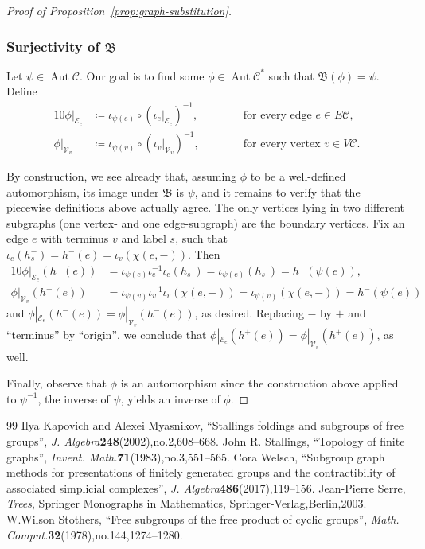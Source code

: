 \documentclass[10pt,a4paper]{amsart}
\theoremstyle{definition}
\newcommand{\cC}{\mathcal{C}}
\newcommand{\cV}{\mathcal{V}}
\newcommand{\cE}{\mathcal{E}}
\DeclareMathOperator{\aut}{Aut}
\newcommand{\Con}{\mathfrak{B}}
\begin{document}
\begin{proof}[Proof of Proposition~\ref{prop:graph-substitution}]

\subsubsection*{Surjectivity of $\Con$} Let ${\psi}\in \aut \cC$. Our goal is to find some ${\phi}\in \aut\cC^*$ such that $\Con({\phi}) = {\psi}$.
Define
\begin{alignat*}{10}
{\phi}|_{\cE_e} &\coloneqq {\iota}_{{\psi}(e)}{\circ}({\iota}_e|_{\cE_e})^{-1}, \qquad& &\text{ for every edge } e \in E\cC,\\
{\phi}|_{\cV_v} &\coloneqq {\iota}_{{\psi}(v)}{\circ}({\iota}_v|_{\cV_v})^{-1}, \qquad &&\text{ for every vertex } v \in V\cC.
\end{alignat*}
 
By construction, we see already that, assuming ${\phi}$ to be a well-defined automorphism, its image under $\Con$ is ${\psi}$, and it remains to verify that the piecewise definitions above actually agree. The only vertices lying in two different subgraphs (one vertex- and one edge-subgraph) are the boundary vertices. Fix an edge $e$ with terminus $v$ and label $s$, such that ${\iota}_e(h_s^{-}) = h^{-}(e) = {\iota}_v({\chi}(e, -))$. Then
\begin{alignat*}{10}
{\phi}|_{\cE_e}(h^{-}(e)) &= {\iota}_{{\psi}(e)}{\iota}_e^{-1}{\iota}_e(h_s^{-}) = {\iota}_{{\psi}(e)}(h_s^{-}) = h^{-}({\psi}(e)),\\
{\phi}|_{\cV_v}(h^{-}(e)) &= {\iota}_{{\psi}(v)}{\iota}_v^{-1}{\iota}_v({\chi}(e, -)) = {\iota}_{{\psi}(v)}({\chi}(e, -)) = h^{-}({\psi}(e))
\end{alignat*}
and ${\phi}|_{\cE_e}(h^{-}(e)) = {\phi}|_{\cV_v}(h^{-}(e))$, as desired. Replacing $-$ by $+$ and ``terminus'' by ``origin'', we conclude that ${\phi}|_{\cE_e}(h^{+}(e)) = {\phi}|_{\cV_v}(h^{+}(e))$, as well.
 
Finally, observe that ${\phi}$ is an automorphism since the construction above applied to ${\psi}^{-1}$, the inverse of $\psi$, yields an inverse of ${\phi}$.\end{proof}

\begin{thebibliography}{99}
 Ilya Kapovich and Alexei Myasnikov, ``Stallings foldings and subgroups of free groups'', \emph{J. Algebra}\textbf{248}(2002),no.2,608--668.
 John R. Stallings, ``Topology of finite graphs'', \emph{Invent. Math.}\textbf{71}(1983),no.3,551--565.
 Cora Welsch, ``Subgroup graph methods for presentations of finitely generated groups and the contractibility of associated simplicial complexes'', \emph{J. Algebra}\textbf{486}(2017),119--156.
 Jean-Pierre Serre, \emph{Trees}, Springer Monographs in Mathematics, Springer-Verlag,Berlin,2003.
 W.Wilson Stothers, ``Free subgroups of the free product of cyclic groups'', \emph{Math. Comput.}\textbf{32}(1978),no.144,1274--1280.
\end{thebibliography}
\end{document}
